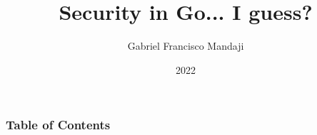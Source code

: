 \documentclass{beamer}
\title{Security in Go... I guess?}
\author{Gabriel Francisco Mandaji}
\date{2022}
\begin{document}
\begin{frame}
    \titlepage
\end{frame}

\begin{frame}
    \frametitle{Table of Contents}
    \tableofcontents[subsectionstyle=hide]
\end{frame}

%
\end{document}
